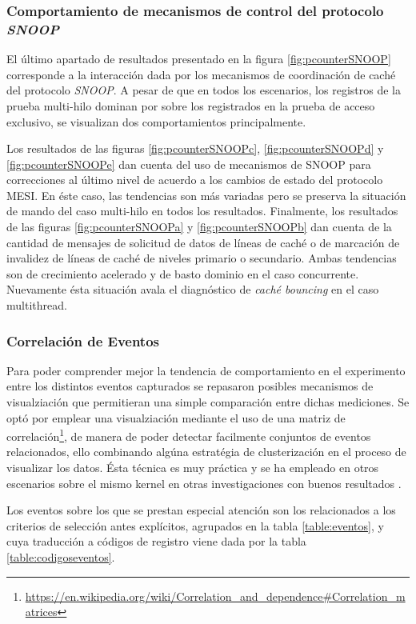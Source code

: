 \subsubsection{Comportamiento de mecanismos de control del protocolo \emph{SNOOP}}
El último apartado de resultados presentado en la figura \ref{fig:pcounterSNOOP} corresponde a la interacción dada por los mecanismos de coordinación de caché del protocolo \emph{SNOOP}. A pesar de que en todos los escenarios, los registros de la prueba multi-hilo dominan por sobre los registrados en la prueba de acceso exclusivo, se visualizan dos comportamientos principalmente.

Los resultados de las figuras \ref{fig:pcounterSNOOPc}, \ref{fig:pcounterSNOOPd} y \ref{fig:pcounterSNOOPe} dan cuenta del uso de mecanismos de SNOOP para correcciones al último nivel de acuerdo a los cambios de estado del protocolo MESI. En éste caso, las tendencias son más variadas pero se preserva la situación de mando del caso multi-hilo en todos los resultados. Finalmente, los resultados de las figuras \ref{fig:pcounterSNOOPa} y \ref{fig:pcounterSNOOPb} dan cuenta de la cantidad de mensajes de solicitud de datos de líneas de caché o de marcación de invalidez de líneas de caché de niveles primario o secundario. Ambas tendencias son de crecimiento acelerado y de basto dominio en el caso concurrente. Nuevamente ésta situación avala el diagnóstico de \emph{caché bouncing} en el caso multithread.

\subsubsection{Correlación de Eventos}
Para poder comprender mejor la tendencia de comportamiento en el experimento entre los distintos eventos capturados se repasaron posibles mecanismos de visualziación que permitieran una simple comparación entre dichas mediciones. Se optó por emplear una visualziación mediante el uso de una matriz de correlación\footnote{\url{https://en.wikipedia.org/wiki/Correlation_and_dependence#Correlation_matrices}}, de manera de poder detectar facilmente conjuntos de eventos relacionados, ello combinando algúna estratégia de clusterización en el proceso de visualizar los datos. Ésta técnica es muy práctica y se ha empleado en otros escenarios sobre el mismo kernel en otras investigaciones con buenos resultados \cite{paper:clusteringKernel}.

Los eventos sobre los que se prestan especial atención son los relacionados a los criterios de selección antes explícitos, agrupados en la tabla \ref{table:eventos}, y cuya traducción a códigos de registro viene dada por la tabla \ref{table:codigoseventos}.

